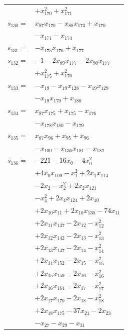 \begin{longtable}{@{}r@{\;}l@{}}
 & \(\displaystyle +x_{170}^{2} +x_{171}^{2}\) \\[3pt]
\(s_{130}=\) & \(\displaystyle x_{87}x_{170} -x_{88}x_{173} +x_{170}\) \\
 & \(\displaystyle -x_{171} -x_{174}\) \\[3pt]
\(s_{131}=\) & \(\displaystyle -x_{175}x_{176} +x_{177}\) \\[3pt]
\(s_{132}=\) & \(\displaystyle -1 -2x_{89}x_{177} -2x_{90}x_{177}\) \\
 & \(\displaystyle +x_{175}^{2} +x_{176}^{2}\) \\[3pt]
\(s_{133}=\) & \(\displaystyle -x_{19} -x_{19}x_{128} -x_{19}x_{129}\) \\
 & \(\displaystyle -x_{19}x_{179} +x_{180}\) \\[3pt]
\(s_{134}=\) & \(\displaystyle x_{87}x_{175} +x_{175} -x_{176}\) \\
 & \(\displaystyle -x_{178}x_{180} -x_{179}\) \\[3pt]
\(s_{135}=\) & \(\displaystyle x_{87}x_{96} +x_{95} +x_{96}\) \\
 & \(\displaystyle -x_{100} -x_{136}x_{181} -x_{182}\) \\[3pt]
\(s_{136}=\) & \(\displaystyle -221 -16x_{0} -4x_{0}^{2}\) \\
 & \(\displaystyle +4x_{0}x_{109} -x_{1}^{2} +2x_{1}x_{114}\) \\
 & \(\displaystyle -2x_{2} -x_{2}^{2} +2x_{2}x_{121}\) \\
 & \(\displaystyle -x_{4}^{2} +2x_{4}x_{124} +2x_{10}\) \\
 & \(\displaystyle +2x_{10}x_{11} +2x_{10}x_{130} -74x_{11}\) \\
 & \(\displaystyle +2x_{11}x_{137} -2x_{12} -x_{12}^{2}\) \\
 & \(\displaystyle +2x_{12}x_{142} -2x_{13} -x_{13}^{2}\) \\
 & \(\displaystyle +2x_{13}x_{147} -2x_{14} -x_{14}^{2}\) \\
 & \(\displaystyle +2x_{14}x_{152} -2x_{15} -x_{15}^{2}\) \\
 & \(\displaystyle +2x_{15}x_{159} -2x_{16} -x_{16}^{2}\) \\
 & \(\displaystyle +2x_{16}x_{164} -2x_{17} -x_{17}^{2}\) \\
 & \(\displaystyle +2x_{17}x_{170} -2x_{18} -x_{18}^{2}\) \\
 & \(\displaystyle +2x_{18}x_{175} -37x_{21} -2x_{23}\) \\
 & \(\displaystyle -x_{27} -x_{29} -x_{31}\) \\

\end{longtable}
